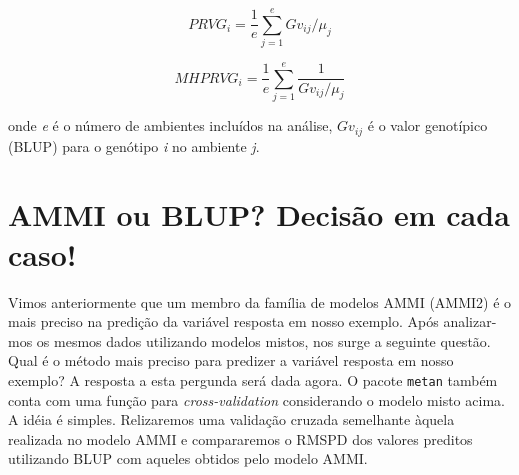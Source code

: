 \documentclass[
]{book}
\newenvironment{Shaded}{\begin{snugshade}}{\end{snugshade}}
\newcommand{\CommentTok}[1]{\textcolor[rgb]{0.56,0.35,0.01}{\textit{#1}}}
\newcommand{\KeywordTok}[1]{\textcolor[rgb]{0.13,0.29,0.53}{\textbf{#1}}}
\newcommand{\NormalTok}[1]{#1}
\newcommand{\OperatorTok}[1]{\textcolor[rgb]{0.81,0.36,0.00}{\textbf{#1}}}
\newcommand{\StringTok}[1]{\textcolor[rgb]{0.31,0.60,0.02}{#1}}
\numberwithin{equation}{section}
\newcommand{\indt}[1]{\index{#1|ST}}
\begin{document}
\[
PRVG_i = \frac{1}{e}\sum\limits_{j = 1}^e {G{v_{ij}}/{\mu_j}}
\]

\[
MHPRVG_i = \frac{1}{e}\sum\limits_{j = 1}^e {\frac{1}{{G{v_{ij}}/{\mu_j}}}}
\]

onde \emph{e} é o número de ambientes incluídos na análise, \(Gv_{ij}\) é o valor genotípico (BLUP) para o genótipo \emph{i} no ambiente \emph{j}.

\begin{Shaded}
\end{Shaded}

\hypertarget{ammi-ou-blup-decisuxe3o-em-cada-caso}{%
\section{AMMI ou BLUP? Decisão em cada caso!}\label{ammi-ou-blup-decisuxe3o-em-cada-caso}}

Vimos anteriormente que um membro da família de modelos AMMI \indt{AMMI}(AMMI2) é o mais preciso na predição da variável resposta em nosso exemplo. Após analizar-mos os mesmos dados utilizando modelos mistos, nos surge a seguinte questão. Qual é o método mais preciso para predizer a variável resposta em nosso exemplo? A resposta a esta pergunda será dada agora. O pacote \texttt{metan} também conta com uma função para \emph{cross-validation} considerando o modelo misto acima. A idéia é simples. Relizaremos uma validação cruzada semelhante àquela realizada no modelo AMMI e compararemos o RMSPD dos valores preditos utilizando BLUP com aqueles obtidos pelo modelo AMMI.
\end{document}
